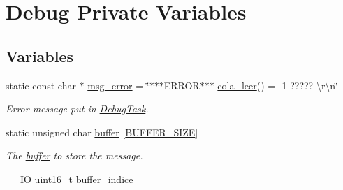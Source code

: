 \hypertarget{group___debug___private___variables}{}\section{Debug Private Variables}
\label{group___debug___private___variables}
\subsection*{Variables}
\begin{DoxyCompactItemize}
\item 
static const char $\ast$ \hyperlink{group___debug___private___variables_ga57ad017acd4535fe089f54ed903b3e9e}{msg\+\_\+error} = \char`\"{}$\ast$$\ast$$\ast$E\+R\+R\+OR$\ast$$\ast$$\ast$ \hyperlink{group___cola___exported___functions___group2_ga12fe948f259d8c9d7a390a76c416b55c}{cola\+\_\+leer}() = -\/1 ????? \textbackslash{}r\textbackslash{}n\char`\"{}\hypertarget{group___debug___private___variables_ga57ad017acd4535fe089f54ed903b3e9e}{}\label{group___debug___private___variables_ga57ad017acd4535fe089f54ed903b3e9e}

\begin{DoxyCompactList}\small\item\em Error message put in \hyperlink{group___debug___exported___functions___group3_ga0e7fca846e34e06a1f62249fe8a30a44}{Debug\+Task}. \end{DoxyCompactList}\item 
static unsigned char \hyperlink{group___debug___private___variables_gacab2203504e72e5e674d3174e0bd7d5e}{buffer} \mbox{[}\hyperlink{group___debug___private___define_ga6b20d41d6252e9871430c242cb1a56e7}{B\+U\+F\+F\+E\+R\+\_\+\+S\+I\+ZE}\mbox{]}\hypertarget{group___debug___private___variables_gacab2203504e72e5e674d3174e0bd7d5e}{}\label{group___debug___private___variables_gacab2203504e72e5e674d3174e0bd7d5e}

\begin{DoxyCompactList}\small\item\em The \hyperlink{group___debug___private___variables_gacab2203504e72e5e674d3174e0bd7d5e}{buffer} to store the message. \end{DoxyCompactList}\item 
\+\_\+\+\_\+\+IO uint16\+\_\+t \hyperlink{group___debug___private___variables_gacd3f15a092421e9fa47f50d4f95f212b}{buffer\+\_\+indice}\hypertarget{group___debug___private___variables_gacd3f15a092421e9fa47f50d4f95f212b}{}\label{group___debug___private___variables_gacd3f15a092421e9fa47f50d4f95f212b}


\end{DoxyCompactItemize}
